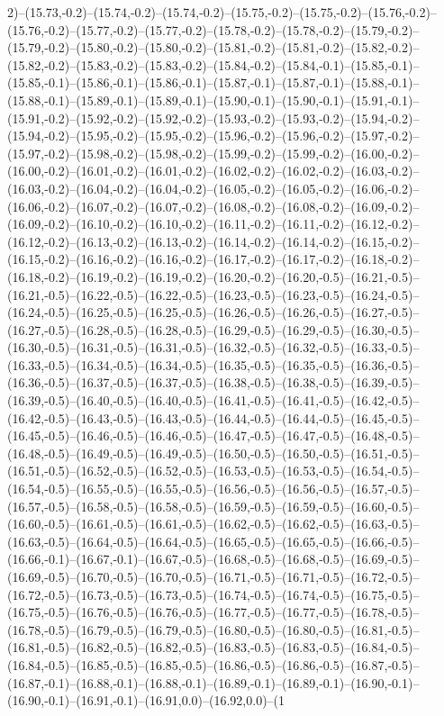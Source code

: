 2)--(15.73,-0.2)--(15.74,-0.2)--(15.74,-0.2)--(15.75,-0.2)--(15.75,-0.2)--(15.76,-0.2)--(15.76,-0.2)--(15.77,-0.2)--(15.77,-0.2)--(15.78,-0.2)--(15.78,-0.2)--(15.79,-0.2)--(15.79,-0.2)--(15.80,-0.2)--(15.80,-0.2)--(15.81,-0.2)--(15.81,-0.2)--(15.82,-0.2)--(15.82,-0.2)--(15.83,-0.2)--(15.83,-0.2)--(15.84,-0.2)--(15.84,-0.1)--(15.85,-0.1)--(15.85,-0.1)--(15.86,-0.1)--(15.86,-0.1)--(15.87,-0.1)--(15.87,-0.1)--(15.88,-0.1)--(15.88,-0.1)--(15.89,-0.1)--(15.89,-0.1)--(15.90,-0.1)--(15.90,-0.1)--(15.91,-0.1)--(15.91,-0.2)--(15.92,-0.2)--(15.92,-0.2)--(15.93,-0.2)--(15.93,-0.2)--(15.94,-0.2)--(15.94,-0.2)--(15.95,-0.2)--(15.95,-0.2)--(15.96,-0.2)--(15.96,-0.2)--(15.97,-0.2)--(15.97,-0.2)--(15.98,-0.2)--(15.98,-0.2)--(15.99,-0.2)--(15.99,-0.2)--(16.00,-0.2)--(16.00,-0.2)--(16.01,-0.2)--(16.01,-0.2)--(16.02,-0.2)--(16.02,-0.2)--(16.03,-0.2)--(16.03,-0.2)--(16.04,-0.2)--(16.04,-0.2)--(16.05,-0.2)--(16.05,-0.2)--(16.06,-0.2)--(16.06,-0.2)--(16.07,-0.2)--(16.07,-0.2)--(16.08,-0.2)--(16.08,-0.2)--(16.09,-0.2)--(16.09,-0.2)--(16.10,-0.2)--(16.10,-0.2)--(16.11,-0.2)--(16.11,-0.2)--(16.12,-0.2)--(16.12,-0.2)--(16.13,-0.2)--(16.13,-0.2)--(16.14,-0.2)--(16.14,-0.2)--(16.15,-0.2)--(16.15,-0.2)--(16.16,-0.2)--(16.16,-0.2)--(16.17,-0.2)--(16.17,-0.2)--(16.18,-0.2)--(16.18,-0.2)--(16.19,-0.2)--(16.19,-0.2)--(16.20,-0.2)--(16.20,-0.5)--(16.21,-0.5)--(16.21,-0.5)--(16.22,-0.5)--(16.22,-0.5)--(16.23,-0.5)--(16.23,-0.5)--(16.24,-0.5)--(16.24,-0.5)--(16.25,-0.5)--(16.25,-0.5)--(16.26,-0.5)--(16.26,-0.5)--(16.27,-0.5)--(16.27,-0.5)--(16.28,-0.5)--(16.28,-0.5)--(16.29,-0.5)--(16.29,-0.5)--(16.30,-0.5)--(16.30,-0.5)--(16.31,-0.5)--(16.31,-0.5)--(16.32,-0.5)--(16.32,-0.5)--(16.33,-0.5)--(16.33,-0.5)--(16.34,-0.5)--(16.34,-0.5)--(16.35,-0.5)--(16.35,-0.5)--(16.36,-0.5)--(16.36,-0.5)--(16.37,-0.5)--(16.37,-0.5)--(16.38,-0.5)--(16.38,-0.5)--(16.39,-0.5)--(16.39,-0.5)--(16.40,-0.5)--(16.40,-0.5)--(16.41,-0.5)--(16.41,-0.5)--(16.42,-0.5)--(16.42,-0.5)--(16.43,-0.5)--(16.43,-0.5)--(16.44,-0.5)--(16.44,-0.5)--(16.45,-0.5)--(16.45,-0.5)--(16.46,-0.5)--(16.46,-0.5)--(16.47,-0.5)--(16.47,-0.5)--(16.48,-0.5)--(16.48,-0.5)--(16.49,-0.5)--(16.49,-0.5)--(16.50,-0.5)--(16.50,-0.5)--(16.51,-0.5)--(16.51,-0.5)--(16.52,-0.5)--(16.52,-0.5)--(16.53,-0.5)--(16.53,-0.5)--(16.54,-0.5)--(16.54,-0.5)--(16.55,-0.5)--(16.55,-0.5)--(16.56,-0.5)--(16.56,-0.5)--(16.57,-0.5)--(16.57,-0.5)--(16.58,-0.5)--(16.58,-0.5)--(16.59,-0.5)--(16.59,-0.5)--(16.60,-0.5)--(16.60,-0.5)--(16.61,-0.5)--(16.61,-0.5)--(16.62,-0.5)--(16.62,-0.5)--(16.63,-0.5)--(16.63,-0.5)--(16.64,-0.5)--(16.64,-0.5)--(16.65,-0.5)--(16.65,-0.5)--(16.66,-0.5)--(16.66,-0.1)--(16.67,-0.1)--(16.67,-0.5)--(16.68,-0.5)--(16.68,-0.5)--(16.69,-0.5)--(16.69,-0.5)--(16.70,-0.5)--(16.70,-0.5)--(16.71,-0.5)--(16.71,-0.5)--(16.72,-0.5)--(16.72,-0.5)--(16.73,-0.5)--(16.73,-0.5)--(16.74,-0.5)--(16.74,-0.5)--(16.75,-0.5)--(16.75,-0.5)--(16.76,-0.5)--(16.76,-0.5)--(16.77,-0.5)--(16.77,-0.5)--(16.78,-0.5)--(16.78,-0.5)--(16.79,-0.5)--(16.79,-0.5)--(16.80,-0.5)--(16.80,-0.5)--(16.81,-0.5)--(16.81,-0.5)--(16.82,-0.5)--(16.82,-0.5)--(16.83,-0.5)--(16.83,-0.5)--(16.84,-0.5)--(16.84,-0.5)--(16.85,-0.5)--(16.85,-0.5)--(16.86,-0.5)--(16.86,-0.5)--(16.87,-0.5)--(16.87,-0.1)--(16.88,-0.1)--(16.88,-0.1)--(16.89,-0.1)--(16.89,-0.1)--(16.90,-0.1)--(16.90,-0.1)--(16.91,-0.1)--(16.91,0.0)--(16.92,0.0)--(1